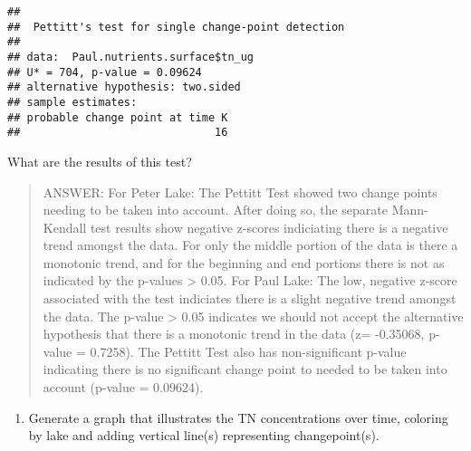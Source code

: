 \documentclass[]{article}
\providecommand{\tightlist}{%
  \setlength{\itemsep}{0pt}\setlength{\parskip}{0pt}}
\begin{document}
\begin{verbatim}
## 
##  Pettitt's test for single change-point detection
## 
## data:  Paul.nutrients.surface$tn_ug
## U* = 704, p-value = 0.09624
## alternative hypothesis: two.sided
## sample estimates:
## probable change point at time K 
##                              16
\end{verbatim}

What are the results of this test?

\begin{quote}
ANSWER: For Peter Lake: The Pettitt Test showed two change points
needing to be taken into account. After doing so, the separate
Mann-Kendall test results show negative z-scores indiciating there is a
negative trend amongst the data. For only the middle portion of the data
is there a monotonic trend, and for the beginning and end portions there
is not as indicated by the p-values \textgreater{} 0.05. For Paul Lake:
The low, negative z-score associated with the test indiciates there is a
slight negative trend amongst the data. The p-value \textgreater{} 0.05
indicates we should not accept the alternative hypothesis that there is
a monotonic trend in the data (z= -0.35068, p-value = 0.7258). The
Pettitt Test also has non-significant p-value indicating there is no
significant change point to needed to be taken into account (p-value =
0.09624).
\end{quote}

\begin{enumerate}
\def\labelenumi{\arabic{enumi}.}
\setcounter{enumi}{4}
\tightlist
\item
  Generate a graph that illustrates the TN concentrations over time,
  coloring by lake and adding vertical line(s) representing
  changepoint(s).
\end{enumerate}
\end{document}
